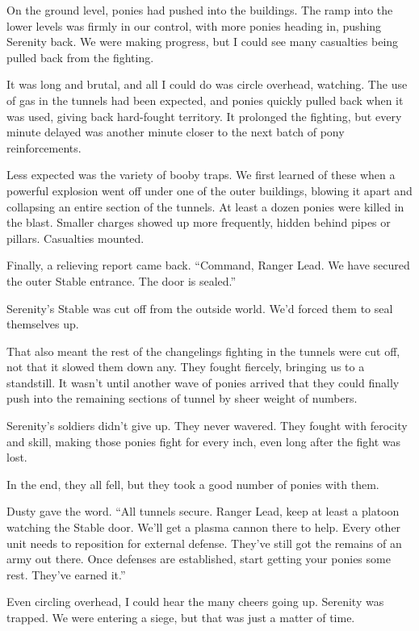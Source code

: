 On the ground level, ponies had pushed into the buildings. The ramp into the lower levels was firmly in our control, with more ponies heading in, pushing Serenity back. We were making progress, but I could see many casualties being pulled back from the fighting.

It was long and brutal, and all I could do was circle overhead, watching. The use of gas in the tunnels had been expected, and ponies quickly pulled back when it was used, giving back hard-fought territory. It prolonged the fighting, but every minute delayed was another minute closer to the next batch of pony reinforcements.

Less expected was the variety of booby traps. We first learned of these when a powerful explosion went off under one of the outer buildings, blowing it apart and collapsing an entire section of the tunnels. At least a dozen ponies were killed in the blast. Smaller charges showed up more frequently, hidden behind pipes or pillars. Casualties mounted.

Finally, a relieving report came back. “Command, Ranger Lead. We have secured the outer Stable entrance. The door is sealed.”

Serenity’s Stable was cut off from the outside world. We’d forced them to seal themselves up.

That also meant the rest of the changelings fighting in the tunnels were cut off, not that it slowed them down any. They fought fiercely, bringing us to a standstill. It wasn’t until another wave of ponies arrived that they could finally push into the remaining sections of tunnel by sheer weight of numbers.

Serenity’s soldiers didn’t give up. They never wavered. They fought with ferocity and skill, making those ponies fight for every inch, even long after the fight was lost.

In the end, they all fell, but they took a good number of ponies with them.

Dusty gave the word. “All tunnels secure. Ranger Lead, keep at least a platoon watching the Stable door. We’ll get a plasma cannon there to help. Every other unit needs to reposition for external defense. They’ve still got the remains of an army out there. Once defenses are established, start getting your ponies some rest. They’ve earned it.”

Even circling overhead, I could hear the many cheers going up. Serenity was trapped. We were entering a siege, but that was just a matter of time.

